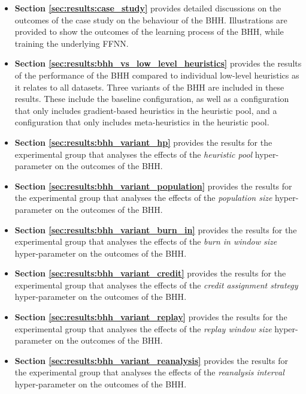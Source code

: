 \begin{itemize}
      \item \textbf{Section \ref{sec:results:case_study}} provides detailed discussions on the outcomes of the case study on the behaviour of the \acs{BHH}. Illustrations are provided to show the outcomes of the learning process of the \acs{BHH}, while training the underlying \acf{FFNN}.

      \item \textbf{Section \ref{sec:results:bhh_vs_low_level_heuristics}} provides the results of the performance of the \acs{BHH} compared to individual low-level heuristics as it relates to all datasets. Three variants of the \acs{BHH} are included in these results. These include the baseline configuration, as well as a configuration that only includes gradient-based heuristics in the heuristic pool, and a configuration that only includes meta-heuristics in the heuristic pool.

      \item \textbf{Section \ref{sec:results:bhh_variant_hp}} provides the results for the experimental group that analyses the effects of the \textit{heuristic pool} hyper-parameter on the outcomes of the \acs{BHH}.

      \item \textbf{Section \ref{sec:results:bhh_variant_population}} provides the results for the experimental group that analyses the effects of the \textit{population size} hyper-parameter on the outcomes of the \acs{BHH}.

      \item \textbf{Section \ref{sec:results:bhh_variant_burn_in}} provides the results for the experimental group that analyses the effects of the \textit{burn in window size} hyper-parameter on the outcomes of the \acs{BHH}.

      \item \textbf{Section \ref{sec:results:bhh_variant_credit}} provides the results for the experimental group that analyses the effects of the \textit{credit assignment strategy} hyper-parameter on the outcomes of the \acs{BHH}.

      \item \textbf{Section \ref{sec:results:bhh_variant_replay}} provides the results for the experimental group that analyses the effects of the \textit{replay window size} hyper-parameter on the outcomes of the \acs{BHH}.

      \item \textbf{Section \ref{sec:results:bhh_variant_reanalysis}} provides the results for the experimental group that analyses the effects of the \textit{reanalysis interval} hyper-parameter on the outcomes of the \acs{BHH}.


\end{itemize}
